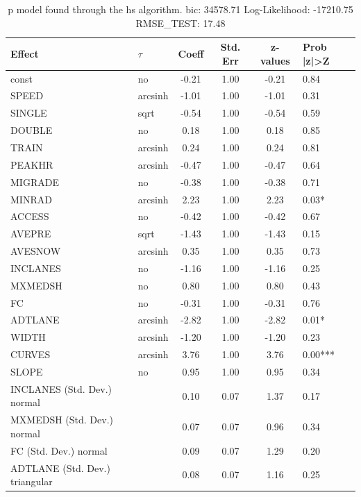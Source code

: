\begin{table}
	\caption{p model found through the hs algorithm. bic: 34578.71 Log-Likelihood: -17210.75 RMSE_TEST: 17.48}
	\begin{center}
		\begin{tabular}{|l|l|c|c|c|l|}
			\hline
			Effect & $\tau$ & Coeff & Std. Err & z-values & Prob |z|>Z \\
			\hline
			const & no & -0.21 & 1.00 & -0.21 & 0.84 \\
			\hline
			SPEED & arcsinh & -1.01 & 1.00 & -1.01 & 0.31 \\
			\hline
			SINGLE & sqrt & -0.54 & 1.00 & -0.54 & 0.59 \\
			\hline
			DOUBLE & no & 0.18 & 1.00 & 0.18 & 0.85 \\
			\hline
			TRAIN & arcsinh & 0.24 & 1.00 & 0.24 & 0.81 \\
			\hline
			PEAKHR & arcsinh & -0.47 & 1.00 & -0.47 & 0.64 \\
			\hline
			MIGRADE & no & -0.38 & 1.00 & -0.38 & 0.71 \\
			\hline
			MINRAD & arcsinh & 2.23 & 1.00 & 2.23 & 0.03* \\
			\hline
			ACCESS & no & -0.42 & 1.00 & -0.42 & 0.67 \\
			\hline
			AVEPRE & sqrt & -1.43 & 1.00 & -1.43 & 0.15 \\
			\hline
			AVESNOW & arcsinh & 0.35 & 1.00 & 0.35 & 0.73 \\
			\hline
			INCLANES & no & -1.16 & 1.00 & -1.16 & 0.25 \\
			\hline
			MXMEDSH & no & 0.80 & 1.00 & 0.80 & 0.43 \\
			\hline
			FC & no & -0.31 & 1.00 & -0.31 & 0.76 \\
			\hline
			ADTLANE & arcsinh & -2.82 & 1.00 & -2.82 & 0.01* \\
			\hline
			WIDTH & arcsinh & -1.20 & 1.00 & -1.20 & 0.23 \\
			\hline
			CURVES & arcsinh & 3.76 & 1.00 & 3.76 & 0.00*** \\
			\hline
			SLOPE & no & 0.95 & 1.00 & 0.95 & 0.34 \\
			\hline
			INCLANES (Std. Dev.) normal &  & 0.10 & 0.07 & 1.37 & 0.17 \\
			\hline
			MXMEDSH (Std. Dev.) normal &  & 0.07 & 0.07 & 0.96 & 0.34 \\
			\hline
			FC (Std. Dev.) normal &  & 0.09 & 0.07 & 1.29 & 0.20 \\
			\hline
			ADTLANE (Std. Dev.) triangular &  & 0.08 & 0.07 & 1.16 & 0.25 \\

\end{tabular}
\end{center}
\end{table}
